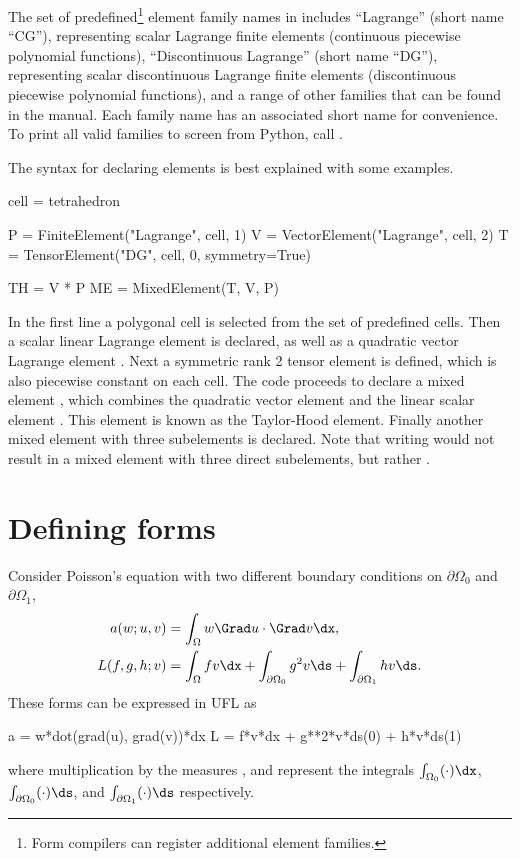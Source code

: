 The set of predefined\footnote{Form compilers can register additional
  element families.}  element family names in \ufl{} includes
``Lagrange'' (short name ``CG''), representing scalar Lagrange finite
elements (continuous piecewise polynomial functions), ``Discontinuous
Lagrange'' (short name ``DG''), representing scalar discontinuous
Lagrange finite elements (discontinuous piecewise polynomial
functions), and a range of other families that can be found in the
manual.  Each family name has an associated short name for
convenience.  To print all valid families to screen from Python, call
.

The syntax for declaring elements is best explained with some
examples.
\begin{python}
cell = tetrahedron

P = FiniteElement("Lagrange", cell, 1)
V = VectorElement("Lagrange", cell, 2)
T = TensorElement("DG", cell, 0, symmetry=True)

TH = V * P
ME = MixedElement(T, V, P)
\end{python}
In the first line a polygonal cell is selected from the set of
predefined cells.  Then a scalar linear Lagrange element  is
declared, as well as a quadratic vector Lagrange element .
Next a symmetric rank 2 tensor element  is defined, which is
also piecewise constant on each cell. The code proceeds to declare a
mixed element , which combines the quadratic vector element
 and the linear scalar element . This element is known
as the Taylor-Hood element.  Finally another mixed element with three
subelements is declared. Note that writing  would not
result in a mixed element with three direct subelements, but rather
.

\section{Defining forms}
\label{ufl:sec:forms}

Consider Poisson's equation with two different boundary
conditions on $\partial\Omega_0$ and $\partial\Omega_1$,
\begin{align}
a(w; u, v) &= \int_\Omega w \Grad u \cdot \Grad v \dx, \\
L(f, g, h; v) &= \int_\Omega f v \dx + \int_{\partial\Omega_0} g^2 v \ds + \int_{\partial\Omega_1} h v \ds.
\end{align}
These forms can be expressed in UFL as
\begin{python}
a = w*dot(grad(u), grad(v))*dx
L = f*v*dx + g**2*v*ds(0) + h*v*ds(1)
\end{python}
where multiplication by the measures ,  and 
represent the integrals $\int_{\Omega_0} (\cdot) \dx$,
$\int_{\partial\Omega_0} (\cdot) \ds$,
and $\int_{\partial\Omega_1} (\cdot) \ds$
respectively.

